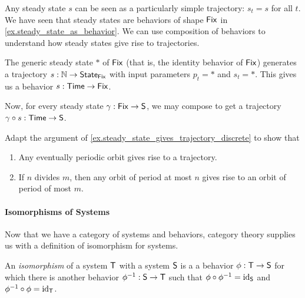 \documentclass[DynamicalBook]{subfiles}
\begin{document}
\begin{example}\label{ex.steady_state_gives_trajectory_discrete}
  Any steady state $s$ can be seen as a particularly simple trajectory: $s_t =
  s$ for all $t$. We have seen
  that steady states are behaviors of shape $\mathsf{Fix}$ in
  \cref{ex.steady_state_as_behavior}. We can use composition of behaviors to
  understand how steady states give rise to trajectories.

  The generic steady state $\ast$ of $\mathsf{Fix}$ (that is, the identity behavior of
  $\mathsf{Fix}$) generates a trajectory $s : \mathbb{N} \to \mathsf{State}_{\mathsf{Fix}}$ with input
  parameters $p_t = \ast$ and $s_t = \ast$. This gives us a behavior $s :
  \mathsf{Time} \to \mathsf{Fix}$.
  
  Now, for every steady state $\gamma : \mathsf{Fix} \to \mathsf{S}$, we may compose
  to get a trajectory $\gamma \circ s : \mathsf{Time} \to \mathsf{S}$.
\end{example}

\begin{exercise}\label{ex.behaviors_as_change_of_kind_discrete}
Adapt the argument of \cref{ex.steady_state_gives_trajectory_discrete} to show
that
\begin{enumerate}
  \item Any eventually periodic orbit gives rise to a trajectory.
  \item If $n$ divides $m$, then any orbit of period at most $n$ gives rise to
    an orbit of period of most $m$.
\end{enumerate}
\end{exercise}

\paragraph{Isomorphisms of Systems}

Now that we have a category of systems and behaviors, category theory supplies
us with a definition of isomorphism for systems. 
\begin{definition}\label{def.isomorphism_of_systems_discrete}
  An \emph{isomorphism} of a system $\mathsf{T}$ with a system $\mathsf{S}$ is a
  a behavior $\phi : \mathsf{T} \to \mathsf{S}$ for which there is another behavior
  $\phi^{-1} : \mathsf{S} \to \mathsf{T}$ such that $\phi \circ \phi ^{-1} =
  \mathrm{id}_{\mathsf{S}}$ and $\phi ^{-1} \circ \phi = \mathrm{id}_{\mathsf{T}}$.
\end{definition}
\end{document}
